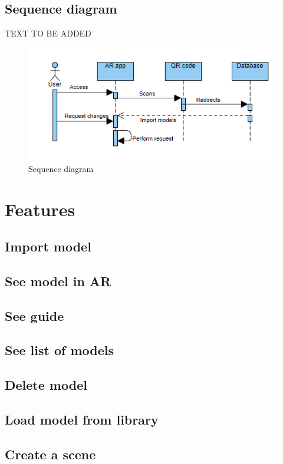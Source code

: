\subsection{Sequence diagram}
TEXT TO BE ADDED
\begin{figure}[h!]
    \begin{center}
        \includegraphics{img/SequenceDiagram.png}
        \caption{Sequence diagram}
        \label{fig:SequenceDiagram}
    \end{center}
\end{figure}

\section{Features}
\subsection{Import model}
\subsection{See model in AR}
\subsection{See guide}
\subsection{See list of models}
\subsection{Delete model}
\subsection{Load model from library}
\subsection{Create a scene}


